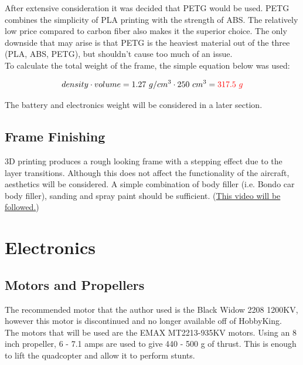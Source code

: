 \documentclass[12pt]{article}
\begin{document}
After extensive consideration it was decided that PETG would be used. PETG combines the simplicity of PLA printing with the strength of ABS. The relatively low price compared to carbon fiber also makes it the superior choice. The only downside that may arise is that PETG is the heaviest material out of the three (PLA, ABS, PETG), but shouldn't cause too much of an issue. 
\\

To calculate the total weight of the frame, the simple equation below was used:

\begin{equation}
density \cdot volume = 1.27\ g/cm\textsuperscript{3} \cdot 250\ cm\textsuperscript{3} = {\color{red}317.5\ g}
\end{equation}

The battery and electronics weight will be considered in a later section.

\subsection{Frame Finishing}
3D printing produces a rough looking frame with a stepping effect due to the layer transitions. Although this does not affect the functionality of the aircraft, aesthetics will be considered. A simple combination of body filler (i.e. Bondo car body filler), sanding and spray paint should be sufficient. (\href{https://www.youtube.com/watch?v=NR2RF40Oq6M}{\color{cyan}This video will be followed.})

\section{Electronics}

\subsection{Motors and Propellers}
The recommended motor that the author used is the Black Widow 2208 1200KV, however this motor is discontinued and no longer available off of HobbyKing.
\\

The motors that will be used are the EMAX MT2213-935KV motors. Using an 8 inch propeller, 6 - 7.1 amps are used to give 440 - 500 g of thrust. This is enough to lift the quadcopter and allow it to perform stunts.
\\
\end{document}
